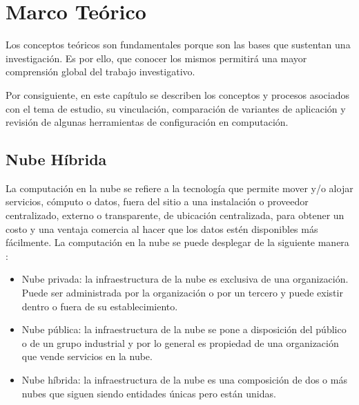 \chapter{Marco Teórico}

\par Los conceptos teóricos son fundamentales porque son las bases que sustentan una investigación. Es por ello, que conocer  los mismos permitirá una mayor comprensión global del trabajo investigativo.\\

\par Por consiguiente, en este capítulo se describen los conceptos y procesos asociados con el tema de estudio, su vinculación, comparación de variantes de aplicación  y revisión de algunas herramientas de configuración en computación.  


\section{Nube Híbrida}

\par La computación en la nube se refiere a la tecnología que permite mover y/o alojar servicios, cómputo o datos, fuera del sitio a una instalación o proveedor centralizado, externo o transparente, de ubicación centralizada, para obtener un costo y una ventaja comercia al hacer que los datos estén disponibles más fácilmente. La computación en la nube se puede desplegar de la siguiente manera \cite{LIB21}:\\

\begin{itemize}
    \item Nube privada: la infraestructura de la nube es exclusiva de una organización. Puede ser administrada por la organización o por un tercero y puede existir dentro o fuera de su establecimiento.
    \item Nube pública: la infraestructura de la nube se pone a disposición del público o de un grupo industrial y por lo general es propiedad de una organización que vende servicios en la nube.
    \item Nube híbrida: la infraestructura de la nube es una composición de dos o más nubes que siguen siendo entidades únicas pero están unidas.
\end{itemize}

